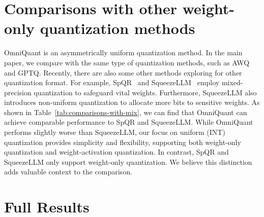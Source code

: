 \documentclass{article} %
\begin{document}
\color{black}
\section{Comparisons with other weight-only quantization methods}\label{sec:comparisons-with-mix}
OmniQuant is an asymmetrically uniform quantization method. In the main paper, we compare with the same type of quantization methods, such as AWQ and GPTQ. Recently, there are also some other methods exploring for other quantization format. For example, SpQR~\citep{spqr} and SqueezeLLM~\citep{squeezellm} employ mixed-precision quantization to safeguard vital weights. Furthermore, SqueezeLLM also introduces non-uniform quantization to allocate more bits to sensitive weights. As shown in Table~\ref{tab:comparisons-with-mix}, we can find that OmniQuant can achieve comparable performance to SpQR and SqueezeLLM. While OmniQuant performs slightly worse than SqueezeLLM, our focus on uniform (INT) quantization provides simplicity and flexibility, supporting both weight-only quantization and weight-activation quantization. In contrast, SpQR and SqueezeLLM only support weight-only quantization. We believe this distinction adds valuable context to the comparison.
\color{black}







\section{Full Results}\label{sec:full-results}
\end{document}
